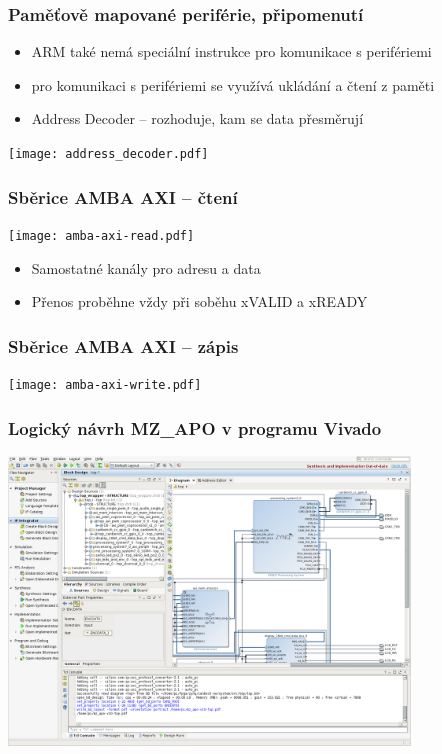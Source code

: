 \documentclass{beamer}
\begin{document}
\begin{frame}
\frametitle{Paměťově mapované periférie, připomenutí}

\begin{itemize}
\item ARM také nemá speciální instrukce pro komunikace s perifériemi
\item pro komunikaci s perifériemi se využívá ukládání a čtení z paměti
\item Address Decoder -- rozhoduje, kam se data přesměrují
\end{itemize}
\begin{center}
\texttt{[image: address\_decoder.pdf]}
\end{center}
\end{frame}

\begin{frame}
\frametitle{Sběrice AMBA AXI -- čtení}

\begin{center}
\texttt{[image: amba-axi-read.pdf]}
\end{center}

\begin{itemize}
\item Samostatné kanály pro adresu a data
\item Přenos proběhne vždy při soběhu xVALID a xREADY
\end{itemize}

\end{frame}

\begin{frame}
\frametitle{Sběrice AMBA AXI -- zápis}

\begin{center}
\texttt{[image: amba-axi-write.pdf]}
\end{center}

\end{frame}

\begin{frame}
\frametitle{Logický návrh MZ\_APO v programu Vivado}
  \begin{center}
    \includegraphics[width=0.8\textwidth]{fig/mz_apo-vivado-screenshot.png}
  \end{center}
\end{frame}
\end{document}
